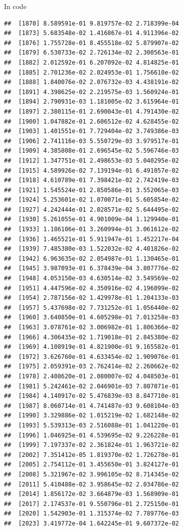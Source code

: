 \documentclass[ignorenonframetext,]{beamer}
\begin{document}
\begin{frame}[fragile]{In code}
\begin{verbatim}
##  [1870] 8.589591e-01 9.819757e-02 2.718399e-04
##  [1873] 5.683548e-02 1.416867e-01 4.911396e-02
##  [1876] 1.755728e-01 8.455518e-02 5.879907e-02
##  [1879] 6.530733e-02 2.726134e-02 2.300563e-01
##  [1882] 2.012592e-01 6.207092e-02 4.814825e-01
##  [1885] 2.701236e-02 2.024953e-01 1.756610e-02
##  [1888] 1.840076e-02 2.076732e-03 4.438191e-02
##  [1891] 4.398625e-02 2.219575e-03 1.560924e-01
##  [1894] 2.790931e-03 1.181005e-02 3.615964e-01
##  [1897] 2.380115e-01 2.690043e-01 4.791430e-02
##  [1900] 1.047882e-01 2.606512e-02 4.628455e-02
##  [1903] 1.401551e-01 7.729404e-02 3.749386e-03
##  [1906] 2.741116e-03 5.550729e-03 3.979517e-01
##  [1909] 4.385808e-01 2.696545e-02 5.596746e-03
##  [1912] 1.347751e-01 2.498653e-03 5.040295e-02
##  [1915] 4.589926e-02 7.139194e-01 6.491057e-02
##  [1918] 4.610789e-01 7.398421e-02 2.742419e-03
##  [1921] 1.545524e-01 2.850586e-01 3.552065e-03
##  [1924] 5.253601e-02 1.070071e-01 5.605854e-02
##  [1927] 4.242444e-01 2.028571e-02 5.644495e-02
##  [1930] 5.261055e-01 4.901009e-04 1.129940e-01
##  [1933] 1.186106e-01 3.260994e-01 3.061612e-02
##  [1936] 1.465521e-01 5.911947e-01 1.452217e-04
##  [1939] 7.485380e-03 1.522032e-02 4.401826e-02
##  [1942] 6.963635e-02 2.054987e-01 1.130465e-01
##  [1945] 3.987093e-01 6.378439e-04 3.807776e-02
##  [1948] 4.053150e-03 4.630514e-02 3.549569e-02
##  [1951] 4.447596e-02 4.350916e-02 4.196099e-02
##  [1954] 2.787156e-02 1.429978e-01 1.204133e-03
##  [1957] 5.437698e-02 7.731252e-01 1.056440e-02
##  [1960] 3.640850e-01 4.605298e-01 7.013258e-03
##  [1963] 3.078761e-02 3.006982e-01 1.806366e-02
##  [1966] 4.306435e-02 1.719018e-01 2.845380e-02
##  [1969] 4.108919e-01 4.821900e-01 9.165582e-01
##  [1972] 3.626760e-01 4.633454e-02 1.909076e-01
##  [1975] 2.059391e-03 2.762414e-02 2.260662e-02
##  [1978] 2.408620e-01 2.080007e-02 4.048503e-01
##  [1981] 5.242461e-02 2.046901e-03 7.807071e-01
##  [1984] 4.140917e-02 5.476839e-03 8.847710e-01
##  [1987] 8.060714e-01 4.741487e-03 9.608104e-03
##  [1990] 3.329886e-02 1.015219e-02 1.682148e-02
##  [1993] 5.539313e-03 2.516088e-01 1.041220e-01
##  [1996] 1.046925e-01 4.539695e-02 9.226228e-01
##  [1999] 7.197337e-02 2.361824e-01 1.963721e-02
##  [2002] 7.351412e-05 1.819370e-02 1.726278e-01
##  [2005] 2.754112e-01 3.455650e-01 3.824127e-01
##  [2008] 5.321967e-02 3.996105e-02 8.714345e-02
##  [2011] 5.410488e-02 3.958645e-02 2.034786e-02
##  [2014] 1.856172e-02 3.664879e-03 1.568909e-01
##  [2017] 2.174537e-01 9.550796e-01 2.725150e-01
##  [2020] 1.542903e-01 1.315374e-02 7.789776e-03
##  [2023] 3.419772e-04 1.642245e-01 9.607372e-02

\end{verbatim}
\end{frame}
\end{document}
